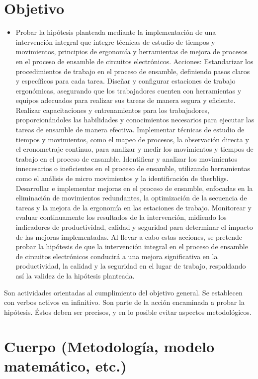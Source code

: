 \section{Objetivo}
\begin{itemize}
    \item Probar la hipótesis planteada mediante la implementación de una intervención integral que integre técnicas de estudio de tiempos y movimientos, principios de ergonomía y herramientas de mejora de procesos en el proceso de ensamble de circuitos electrónicos.
Acciones:
Estandarizar los procedimientos de trabajo en el proceso de ensamble, definiendo pasos claros y específicos para cada tarea.
Diseñar y configurar estaciones de trabajo ergonómicas, asegurando que los trabajadores cuenten con herramientas y equipos adecuados para realizar sus tareas de manera segura y eficiente.
Realizar capacitaciones y entrenamientos para los trabajadores, proporcionándoles las habilidades y conocimientos necesarios para ejecutar las tareas de ensamble de manera efectiva.
Implementar técnicas de estudio de tiempos y movimientos, como el mapeo de procesos, la observación directa y el cronometraje continuo, para analizar y medir los movimientos y tiempos de trabajo en el proceso de ensamble.
Identificar y analizar los movimientos innecesarios o ineficientes en el proceso de ensamble, utilizando herramientas como el análisis de micro movimientos y la identificación de therbligs.
Desarrollar e implementar mejoras en el proceso de ensamble, enfocadas en la eliminación de movimientos redundantes, la optimización de la secuencia de tareas y la mejora de la ergonomía en las estaciones de trabajo.
Monitorear y evaluar continuamente los resultados de la intervención, midiendo los indicadores de productividad, calidad y seguridad para determinar el impacto de las mejoras implementadas.
Al llevar a cabo estas acciones, se pretende probar la hipótesis de que la intervención integral en el proceso de ensamble de circuitos electrónicos conducirá a una mejora significativa en la productividad, la calidad y la seguridad en el lugar de trabajo, respaldando así la validez de la hipótesis planteada.

\end{itemize}

Son actividades orientadas al cumplimiento del objetivo general. Se establecen con verbos activos en infinitivo. Son parte de la acción encaminada a probar la hipótesis. Éstos deben ser precisos, y en lo posible evitar aspectos metodológicos.
% 
% 
\section{Cuerpo (Metodología, modelo matemático, etc.)}

